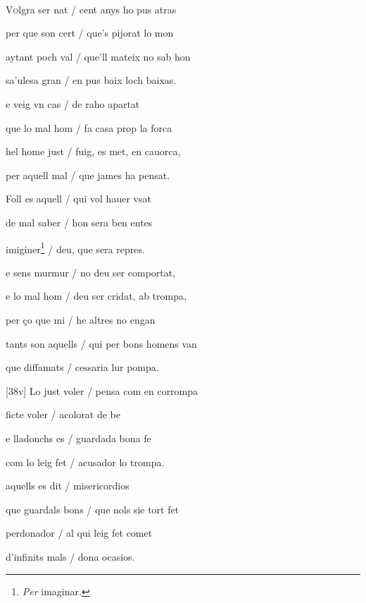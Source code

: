 \documentclass[12pt]{article}
\renewcommand{\espaiAbansEtiquetaPoema}{\vspace{0ex}}
\begin{document}
\begin{estrofa}

\espaiAbansEtiquetaPoema

\\

\end{estrofa}


\begin{estrofa}

 V\textsc{o}lgra ser nat / cent anys ho pus atras

 per que son cert / que's pijorat lo mon

 aytant poch val / que'll mateix no sab hon

 sa'ulesa gran / en pus baix loch baixas.

 e veig vn cas / de raho apartat

 que lo mal hom / fa casa prop la forca

 hel home just / fuig, es met, en cauorca,

 per aquell mal / que james ha pensat.

\end{estrofa}



\begin{estrofa}

 Foll es aquell / qui vol hauer vsat

 de mal saber / hon sera ben entes

 imiginer\footnote{\textit{Per} imaginar.} / deu, que sera repres.

 e sens murmur / no deu ser comportat,

 e lo mal hom / deu ser cridat, ab trompa,

 per \c{c}o que mi / he altres no engan

 tants son aquells / qui per bons homens van

 que diffamats / cessaria lur pompa.

\end{estrofa}



\begin{estrofa}

 [38v] Lo just voler / pensa com en corrompa

 ficte voler / acolorat de be

 e lladonchs es / guardada bona fe

 com lo leig fet / acusador lo trompa.

 aquells es dit / misericordios

 que guardals bons / que nols sie tort fet

 perdonador / al qui leig fet comet

 d'infinits mals / dona ocasios.

\end{estrofa}
\end{document}
